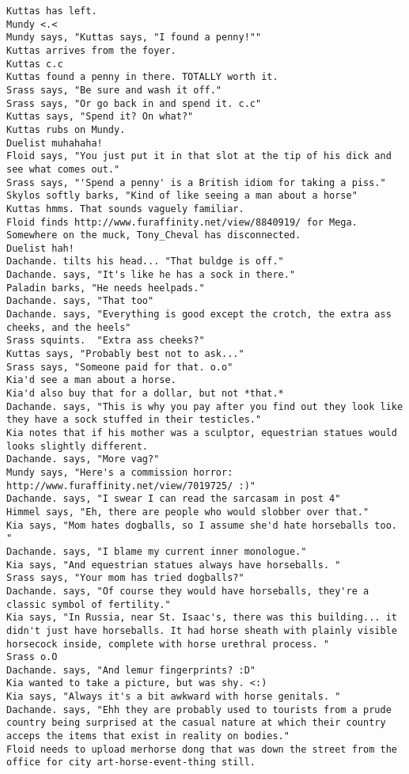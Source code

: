 \begin{verbatim}
Kuttas has left.
Mundy <.<
Mundy says, "Kuttas says, "I found a penny!""
Kuttas arrives from the foyer.
Kuttas c.c
Kuttas found a penny in there. TOTALLY worth it.
Srass says, "Be sure and wash it off."
Srass says, "Or go back in and spend it. c.c"
Kuttas says, "Spend it? On what?"
Kuttas rubs on Mundy.
Duelist muhahaha!
Floid says, "You just put it in that slot at the tip of his dick and see what comes out."
Srass says, "'Spend a penny' is a British idiom for taking a piss."
Skylos softly barks, "Kind of like seeing a man about a horse"
Kuttas hmms. That sounds vaguely familiar.
Floid finds http://www.furaffinity.net/view/8840919/ for Mega.
Somewhere on the muck, Tony_Cheval has disconnected.
Duelist hah!
Dachande. tilts his head... "That buldge is off."
Dachande. says, "It's like he has a sock in there."
Paladin barks, "He needs heelpads."
Dachande. says, "That too"
Dachande. says, "Everything is good except the crotch, the extra ass cheeks, and the heels"
Srass squints.  "Extra ass cheeks?"
Kuttas says, "Probably best not to ask..."
Srass says, "Someone paid for that. o.o"
Kia'd see a man about a horse.
Kia'd also buy that for a dollar, but not *that.*
Dachande. says, "This is why you pay after you find out they look like they have a sock stuffed in their testicles."
Kia notes that if his mother was a sculptor, equestrian statues would looks slightly different.
Dachande. says, "More vag?"
Mundy says, "Here's a commission horror: http://www.furaffinity.net/view/7019725/ :)"
Dachande. says, "I swear I can read the sarcasam in post 4"
Himmel says, "Eh, there are people who would slobber over that."
Kia says, "Mom hates dogballs, so I assume she'd hate horseballs too. "
Dachande. says, "I blame my current inner monologue."
Kia says, "And equestrian statues always have horseballs. "
Srass says, "Your mom has tried dogballs?"
Dachande. says, "Of course they would have horseballs, they're a classic symbol of fertility."
Kia says, "In Russia, near St. Isaac's, there was this building... it didn't just have horseballs. It had horse sheath with plainly visible horsecock inside, complete with horse urethral process. "
Srass o.O
Dachande. says, "And lemur fingerprints? :D"
Kia wanted to take a picture, but was shy. <:)
Kia says, "Always it's a bit awkward with horse genitals. "
Dachande. says, "Ehh they are probably used to tourists from a prude country being surprised at the casual nature at which their country acceps the items that exist in reality on bodies."
Floid needs to upload merhorse dong that was down the street from the office for city art-horse-event-thing still.

\end{verbatim}
